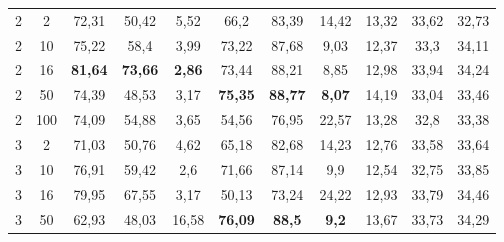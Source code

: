 \begin{table}[ht]
\begin{tabular}{cc|ccc|ccc|ccc}
        {2}                           & {2}    & {72,31}                             & {50,42}                             & {5,52}                                   & {66,2}           & {83,39}          & {14,42}         & {13,32}       & {33,62}     & {32,73}     \\
        {2}                           & {10}   & {75,22}                             & {58,4}                              & {3,99}                                   & {73,22}          & {87,68}          & {9,03}          & {12,37}       & {33,3}      & {34,11}     \\
        {2}                           & {16}   & {\textbf{81,64}}                    & {\textbf{73,66}}                    & {\textbf{2,86}}                          & {73,44}          & {88,21}          & {8,85}          & {12,98}       & {33,94}     & {34,24}     \\
        {2}                           & {50}   & {74,39}                             & {48,53}                             & {3,17}                                   & {\textbf{75,35}} & {\textbf{88,77}} & {\textbf{8,07}} & {14,19}       & {33,04}     & {33,46}     \\
        {2}                           & {100}  & {74,09}                             & {54,88}                             & {3,65}                                   & {54,56}          & {76,95}          & {22,57}         & {13,28}       & {32,8}      & {33,38}     \\
        {3}                           & {2}    & {71,03}                             & {50,76}                             & {4,62}                                   & {65,18}          & {82,68}          & {14,23}         & {12,76}       & {33,58}     & {33,64}     \\
        {3}                           & {10}   & {76,91}                             & {59,42}                             & {2,6}                                    & {71,66}          & {87,14}          & {9,9}           & {12,54}       & {32,75}     & {33,85}     \\
        {3}                           & {16}   & {79,95}                             & {67,55}                             & {3,17}                                   & {50,13}          & {73,24}          & {24,22}         & {12,93}       & {33,79}     & {34,46}     \\
        {3}                           & {50}   & {62,93}                             & {48,03}                             & {16,58}                                  & {\textbf{76,09}} & {\textbf{88,5}}  & {\textbf{9,2}}  & {13,67}       & {33,73}     & {34,29}     \\

\end{tabular}
\end{table}
